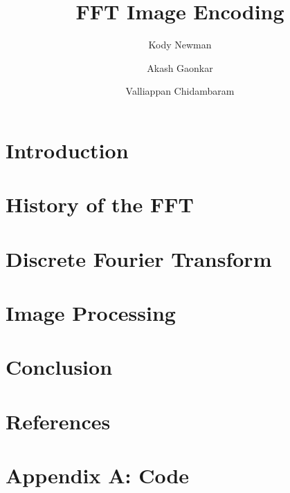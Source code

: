\documentclass[sigplan]{acmart}
\author{Kody Newman}
\author{Akash Gaonkar}
\author{Valliappan Chidambaram}
\title{FFT Image Encoding}
\begin{document}
  \maketitle

  \section{Introduction}
	

  \section{History of the FFT}
	

  \section{Discrete Fourier Transform}
	

  \section{Image Processing}
	

  \section{Conclusion}
	

  \section{References}
	

	\onecolumn\newpage
	\section{Appendix A: Code}
	
\end{document}
